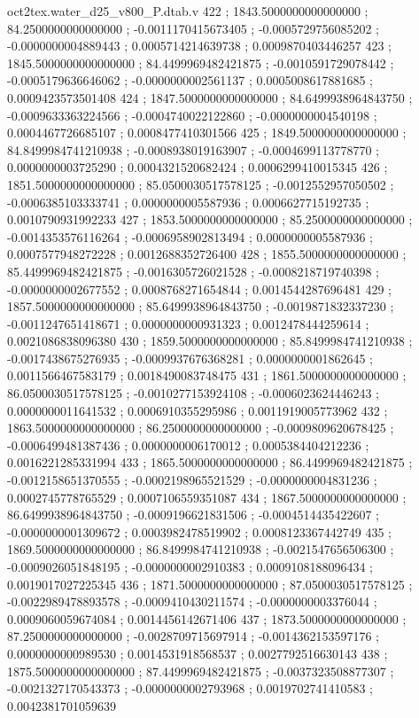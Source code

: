 \begin{filecontents}[overwrite]{oct2tex.water_d25_v800_P.dtab.v}
422 ; 1843.5000000000000000 ; 84.2500000000000000 ; -0.0011170415673405 ; -0.0005729756085202 ; -0.0000000004889443 ; 0.0005714214639738 ; 0.0009870403446257
423 ; 1845.5000000000000000 ; 84.4499969482421875 ; -0.0010591729078442 ; -0.0005179636646062 ; -0.0000000002561137 ; 0.0005008617881685 ; 0.0009423573501408
424 ; 1847.5000000000000000 ; 84.6499938964843750 ; -0.0009633363224566 ; -0.0004740022122860 ; -0.0000000004540198 ; 0.0004467726685107 ; 0.0008477410301566
425 ; 1849.5000000000000000 ; 84.8499984741210938 ; -0.0008938019163907 ; -0.0004699113778770 ; 0.0000000003725290 ; 0.0004321520682424 ; 0.0006299410015345
426 ; 1851.5000000000000000 ; 85.0500030517578125 ; -0.0012552957050502 ; -0.0006385103333741 ; 0.0000000005587936 ; 0.0006627715192735 ; 0.0010790931992233
427 ; 1853.5000000000000000 ; 85.2500000000000000 ; -0.0014353576116264 ; -0.0006958902813494 ; 0.0000000005587936 ; 0.0007577948272228 ; 0.0012688352726400
428 ; 1855.5000000000000000 ; 85.4499969482421875 ; -0.0016305726021528 ; -0.0008218719740398 ; -0.0000000002677552 ; 0.0008768271654844 ; 0.0014544287696481
429 ; 1857.5000000000000000 ; 85.6499938964843750 ; -0.0019871832337230 ; -0.0011247651418671 ; 0.0000000000931323 ; 0.0012478444259614 ; 0.0021086838096380
430 ; 1859.5000000000000000 ; 85.8499984741210938 ; -0.0017438675276935 ; -0.0009937676368281 ; 0.0000000001862645 ; 0.0011566467583179 ; 0.0018490083748475
431 ; 1861.5000000000000000 ; 86.0500030517578125 ; -0.0010277153924108 ; -0.0006023624446243 ; 0.0000000011641532 ; 0.0006910355295986 ; 0.0011919005773962
432 ; 1863.5000000000000000 ; 86.2500000000000000 ; -0.0009809620678425 ; -0.0006499481387436 ; 0.0000000006170012 ; 0.0005384404212236 ; 0.0016221285331994
433 ; 1865.5000000000000000 ; 86.4499969482421875 ; -0.0012158651370555 ; -0.0002198965521529 ; -0.0000000004831236 ; 0.0002745778765529 ; 0.0007106559351087
434 ; 1867.5000000000000000 ; 86.6499938964843750 ; -0.0009196621831506 ; -0.0004514435422607 ; -0.0000000001309672 ; 0.0003982478519902 ; 0.0008123367442749
435 ; 1869.5000000000000000 ; 86.8499984741210938 ; -0.0021547656506300 ; -0.0009026051848195 ; -0.0000000002910383 ; 0.0009108188096434 ; 0.0019017027225345
436 ; 1871.5000000000000000 ; 87.0500030517578125 ; -0.0022989478893578 ; -0.0009410430211574 ; -0.0000000003376044 ; 0.0009060059674084 ; 0.0014456142671406
437 ; 1873.5000000000000000 ; 87.2500000000000000 ; -0.0028709715697914 ; -0.0014362153597176 ; 0.0000000000989530 ; 0.0014531918568537 ; 0.0027792516630143
438 ; 1875.5000000000000000 ; 87.4499969482421875 ; -0.0037323508877307 ; -0.0021327170543373 ; -0.0000000002793968 ; 0.0019702741410583 ; 0.0042381701059639

\end{filecontents}
